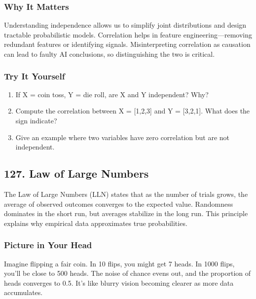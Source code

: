 \documentclass[
  letterpaper,
  DIV=11,
  numbers=noendperiod]{scrreprt}
\providecommand{\tightlist}{%
  \setlength{\itemsep}{0pt}\setlength{\parskip}{0pt}}
\begin{document}
\subsubsection{Why It Matters}\label{why-it-matters-23}

Understanding independence allows us to simplify joint distributions and
design tractable probabilistic models. Correlation helps in feature
engineering---removing redundant features or identifying signals.
Misinterpreting correlation as causation can lead to faulty AI
conclusions, so distinguishing the two is critical.

\subsubsection{Try It Yourself}\label{try-it-yourself-125}

\begin{enumerate}
\def\labelenumi{\arabic{enumi}.}
\tightlist
\item
  If X = coin toss, Y = die roll, are X and Y independent? Why?
\item
  Compute the correlation between X = {[}1,2,3{]} and Y = {[}3,2,1{]}.
  What does the sign indicate?
\item
  Give an example where two variables have zero correlation but are not
  independent.
\end{enumerate}

\subsection{127. Law of Large Numbers}\label{law-of-large-numbers}

The Law of Large Numbers (LLN) states that as the number of trials
grows, the average of observed outcomes converges to the expected value.
Randomness dominates in the short run, but averages stabilize in the
long run. This principle explains why empirical data approximates true
probabilities.

\subsubsection{Picture in Your Head}\label{picture-in-your-head-126}

Imagine flipping a fair coin. In 10 flips, you might get 7 heads. In
1000 flips, you'll be close to 500 heads. The noise of chance evens out,
and the proportion of heads converges to 0.5. It's like blurry vision
becoming clearer as more data accumulates.
\end{document}
